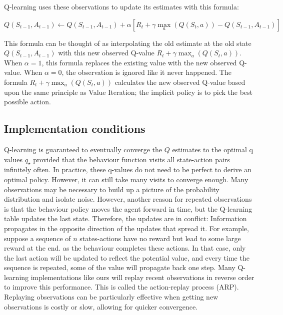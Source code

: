 \documentclass[]{final_report}
\begin{document}
Q-learning uses these observations to update its estimates with this formula:

\begin{equation}
  Q(S_{t-1}, A_{t-1}) \leftarrow Q(S_{t-1}, A_{t-1}) +  \alpha [R_t + \gamma \max_a(Q(S_t,a)) - Q(S_{t-1}, A_{t-1})]
  \label{eqn:q-learning-update-formula}
\end{equation}


This formula can be thought of as interpolating the old estimate at the old state $Q(S_{t-1}, A_{t-1})$ with this new observed Q-value $R_t + \gamma \max_a(Q(S_t, a))$. When $\alpha = 1$, this formula replaces the existing value with the new observed Q-value.  When $\alpha = 0$, the observation is ignored like it never happened. The formula $R_t + \gamma \max_a(Q(S_t, a))$ calculates the new observed Q-value based upon the same principle as Value Iteration; the implicit policy is to pick the best possible action. 

\subsection{Implementation conditions}\label{section:impl-conditions}

Q-learning is guaranteed to eventually converge the $Q$ estimates to the optimal q values $q_\star$ provided that the behaviour function visits all state-action pairs infinitely often. In practice, these q-values do not need to be perfect to derive an optimal policy. However, it can still take many visits to converge enough. Many observations may be necessary to build up a picture of the probability distribution and isolate noise. However, another reason for repeated observations is that the behaviour policy moves the agent forward in time, but the Q-learning table updates the last state. Therefore, the updates are in conflict: Information propagates in the opposite direction of the updates that spread it. For example, suppose a sequence of $n$ states-actions have no reward but lead to some large reward at the end. as the behaviour completes these actions. In that case, only the last action will be updated to reflect the potential value, and every time the sequence is repeated, some of the value will propagate back one step. Many Q-learning implementations like ours will replay recent observations in reverse order to improve this performance. This is called the action-replay process (ARP). Replaying observations can be particularly effective when getting new observations is costly or slow, allowing for quicker convergence.
\end{document}

